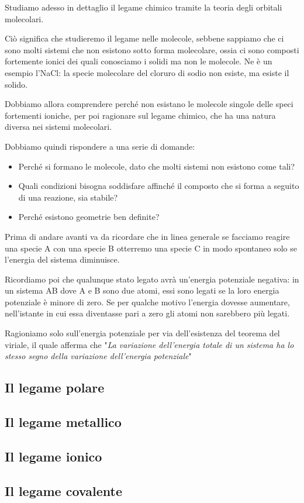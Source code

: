 Studiamo adesso in dettaglio il legame chimico tramite la teoria degli orbitali molecolari.

Ciò significa che studieremo il legame nelle molecole, sebbene sappiamo che ci sono molti sistemi che non esistono sotto forma molecolare, ossia ci sono composti fortemente ionici dei quali conosciamo i solidi ma non le molecole. Ne è un esempio l'NaCl: la specie molecolare del cloruro di sodio non esiste, ma esiste il solido.

Dobbiamo allora comprendere perché non esistano le molecole singole delle speci fortementi ioniche, per poi ragionare sul legame chimico, che ha una natura diversa nei sistemi molecolari.

Dobbiamo quindi rispondere a una serie di domande:
\begin{itemize}
    \item Perché si formano le molecole, dato che molti sistemi non esistono come tali?
    \item Quali condizioni bisogna soddisfare affinché il composto che si forma a seguito di una reazione, sia stabile?
    \item Perché esistono geometrie ben definite?
\end{itemize}
Prima di andare avanti va da ricordare che in linea generale se facciamo reagire una specie A con una specie B otterremo una specie C in modo spontaneo solo se l'energia del sistema diminuisce. 

Ricordiamo poi che qualunque stato legato avrà un'energia potenziale negativa: in un sistema AB dove A e B sono due atomi, essi sono legati se la loro energia potenziale è minore di zero. Se per qualche motivo l'energia dovesse aumentare, nell'istante in cui essa diventasse pari a zero gli atomi non sarebbero più legati.

Ragioniamo solo sull'energia potenziale per via dell'esistenza del teorema del viriale, il quale afferma che "\textit{La variazione dell'energia totale di un sistema ha lo stesso segno della variazione dell'energia potenziale}"
\subsection{Il legame polare}
\subsection{Il legame metallico}
\subsection{Il legame ionico}
\subsection{Il legame covalente}